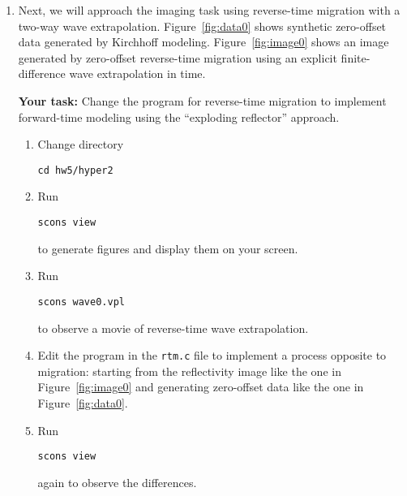 \begin{enumerate}




\lstset{language=python,numbers=left,numberstyle=\tiny,showstringspaces=false}
\small 

\item Next, we will approach the imaging task using reverse-time migration with a two-way wave extrapolation. Figure~\ref{fig:data0} shows synthetic zero-offset data generated by Kirchhoff modeling. Figure~\ref{fig:image0} shows an image generated by zero-offset reverse-time migration using an explicit finite-difference wave extrapolation in time.

\newpage

  \textbf{Your task:} Change the program for reverse-time migration to
  implement forward-time modeling using the ``exploding reflector''
  approach.

    \begin{enumerate}
    \item Change directory 
\begin{verbatim}
cd hw5/hyper2
\end{verbatim}
    \item Run
\begin{verbatim}
scons view
\end{verbatim}
      to generate figures and display them on your screen.
  \item Run
\begin{verbatim}
scons wave0.vpl
\end{verbatim}
      to observe a movie of reverse-time wave extrapolation.
    \item Edit the program in the \texttt{rtm.c} file to implement a process opposite to migration: starting from the reflectivity image like the one in Figure~\ref{fig:image0} and generating zero-offset data like the one in Figure~\ref{fig:data0}. 
    \item Run
\begin{verbatim}
scons view
\end{verbatim}
      again to observe the differences.
    \end{enumerate}


\end{enumerate}
